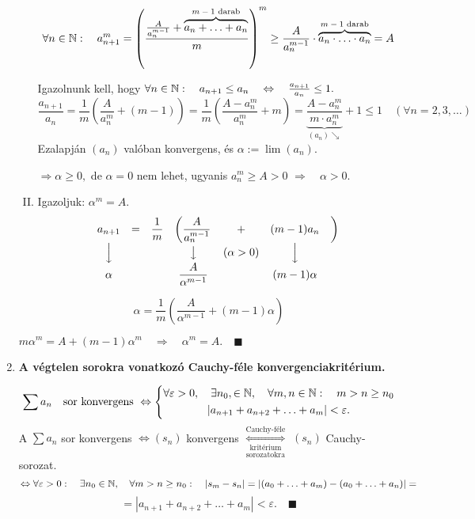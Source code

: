 \documentclass[a4paper,11.5pt]{article}
\begin{document}
\begin{enumerate}
\begin{enumerate}[I. lépés:]
			\[ \forall n\in\mathbb{N}:\quad a_{n+1}^m=\left(\frac{\frac{A}{a_n^{m-1}}+\overbrace{a_n+\ldots+ a_n}^\text{$m-1$ darab}}{m}\right)^m \geq \frac{A}{a_n^{m-1}}\cdot\overbrace{a_n\cdot\ldots\cdot a_n}^\text{$m-1$ darab} = A  \]
			
			Igazolnunk kell, hogy $\forall n\in\mathbb{N}:\quad a_{n+1}\leq a_n\quad  \Leftrightarrow\quad  \frac{a_{n+1}}{a_n}\leq1.$
			\[ \frac{a_{n+1}}{a_n}=\frac{1}{m}\left(\frac{A}{a^m_n}+(m-1)\right)=\frac{1}{m}\left(\frac{A-a^m_n}{a_n^m}+m\right)=\underbrace{\frac{A-a_n^m}{m\cdot a_n^m}}_{(a_n)\searrow}+1\leq 1\quad (\forall n=2,3,\ldots) \]
			Ezalapján $(a_n)$ valóban konvergens, és $\alpha:=\lim(a_n)$.
			
			$\Rightarrow \alpha\geq0,$ de $\alpha=0$ nem lehet, ugyanis $a_n^m\geq A>0$ \quad $\Rightarrow\quad  \alpha>0.$ 
			\item Igazoljuk: $\alpha^m=A.$
			\[\begin{matrix}
			a_{n+1}&=&\displaystyle\frac{1}{m}&\left(\displaystyle\frac{A}{a_n^{m-1}}\right.&+&(m-1)a_n&\bigg)
			\\
			\Big\downarrow&&&\big\downarrow &(\alpha>0)&\Big\downarrow&\\
			\alpha&&&\displaystyle\frac{A}{\alpha^{m-1}}&&(m-1)\alpha&\\
			\end{matrix}\]
		\end{enumerate}
		\[ \alpha=\frac{1}{m}\left(\frac{A}{\alpha^{m-1}}+(m-1)\alpha\right) \]
		
		$m\alpha^m=A+(m-1)\alpha^m\quad \Rightarrow\quad \alpha^m=A.\quad \blacksquare$
		
		\item \textbf{A végtelen sorokra vonatkozó Cauchy-féle konvergenciakritérium.}
		
		\[ \sum a_n \quad \text{sor konvergens } \Leftrightarrow \left\{\begin{gathered}
		\forall \varepsilon >0,\quad  \exists n_0,  \in \mathbb{N}, \quad\forall m,n \in \mathbb{N}:\quad m> n \geq n_0\\
		|a_{n+1}+a_{n+2}+\ldots+a_m|<\varepsilon.
		\end{gathered} \right.
		\]
		\biz A $\sum a_n$ sor konvergens $\Leftrightarrow (s_n)$ konvergens $\underset{\text{sorozatokra}}{\underset{\text{kritérium}}{\overset{\text{Cauchy-féle}}{\Longleftrightarrow}}}$ $(s_n)$ Cauchy-sorozat.
		\[ \Leftrightarrow \forall\varepsilon>0:\quad \exists n_0\in \mathbb{N}, \quad\forall m>n\geq n_0: \quad |s_m-s_n|= |(a_0+\ldots+a_m)-(a_0+\ldots+a_n)|=\] \[=|a_{n+1}+a_{n+2}+\ldots+a_m|<\varepsilon. \quad\blacksquare \]
		

\end{enumerate}
\end{document}
